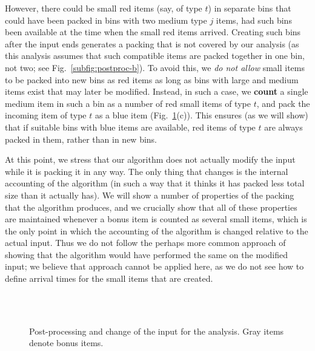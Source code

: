 However,
there could be small red items (say, of type $t$) in separate bins that could have been packed in bins with two medium type $j$ items, 
had such bins been available at the time when the small red items arrived. Creating such bins after the input ends generates a packing that 
is not covered by our analysis (as this analysis assumes that such compatible items are packed together in one bin, not two; see Fig.~\ref{subfig:postproc-b}).
To avoid this, we \emph{do not allow} small items to be packed into new bins as red items as long as bins with large and medium items exist that may later be modified. Instead, in such a case, we \textbf{count} a single medium item in such a bin as a number of red small items of type $t$, and pack the incoming item of type $t$ as a blue item (Fig.~\ref{fig:post-processing}(c)).
This ensures (as we will show) that if suitable bins with blue items are available,
red items of type $t$ are always packed in them, rather than in new bins.

At this point, we stress that our algorithm does not actually modify the input while it is packing it in any way. The only thing that changes is the internal accounting of the algorithm (in such a way that it thinks it has packed less total size than it actually has). We will show a number of properties of the packing that the algorithm produces, and we crucially show that all of these properties are maintained whenever a bonus item is counted as several small items, which is the only point in which the accounting of the algorithm is changed relative to the actual input. Thus we do not follow the perhaps more common approach of showing that the algorithm would have performed the same on the modified input; we believe that approach cannot be applied here, as we do not see how to define arrival times for the small items that are created.


\begin{figure}[t]
	\begin{center}
	\end{center}
	\\
	\\
	\caption{Post-processing and change of the input for the analysis. Gray items denote bonus items.
	\label{fig:post-processing}}
\end{figure}

